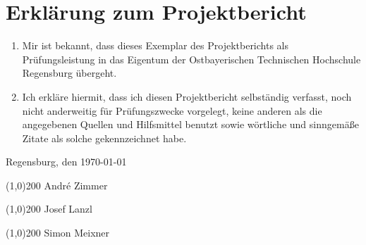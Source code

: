 \thispagestyle{empty}
\section*{Erklärung zum Projektbericht}

\bigskip
\bigskip 
\bigskip 

\begin{enumerate}
    \item Mir ist bekannt, dass dieses Exemplar des Projektberichts als Prüfungsleistung in das Eigentum der Ostbayerischen Technischen Hochschule Regensburg übergeht.
    \item Ich erkläre hiermit, dass ich diesen Projektbericht selbständig verfasst, noch nicht anderweitig für Prüfungszwecke vorgelegt, keine anderen als die angegebenen Quellen und Hilfsmittel benutzt sowie wörtliche und sinngemäße Zitate als solche gekennzeichnet habe.
\end{enumerate}

\bigskip 
\bigskip 
\bigskip 

Regensburg, den \today

\bigskip 
\bigskip

\line(1,0){200}
\newline
André Zimmer

\bigskip 
\bigskip

\line(1,0){200}
\newline
Josef Lanzl

\bigskip 
\bigskip

\line(1,0){200}
\newline
Simon Meixner